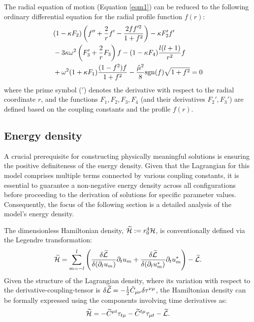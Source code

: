 \documentclass[aps,prd,superscriptaddress,notitlepage,11pt,final,longbibliography,nofootinbib]{revtex4-1}
\newcommand{\be}{\begin{equation}}
\newcommand{\ee}{\end{equation}}
\numberwithin{equation}{section}
\begin{document}
The radial equation of motion (Equation \eqref{eom1}) can be reduced to the following ordinary differential equation for the radial profile function $f(r)$:
\begin{align}
&(1-\kappa F_2)\left(f''+\frac{2}{r}f'-\frac{2ff'^2}{1+f^2}\right)-\kappa F_2'f'\nonumber\\
&-3\kappa\omega^2\left(F_3'+\frac{2}{r}F_3\right)f-(1-\kappa F_4)\frac{l(l+1)}{r^2}f\nonumber\\&+\omega^2(1+\kappa F_1)\frac{(1-f^2)f}{1+f^2}-\frac{\tilde\mu^2}{8}{\rm sgn}(f)\sqrt{1+f^2}=0\label{radialeq}
\end{align}
where the prime symbol ($\prime$) denotes the derivative with respect to the radial coordinate $r$, and the functions $F_1, F_2, F_3, F_4$ (and their derivatives $F_2', F_3'$) are defined based on the coupling constants and the profile $f(r)$.






\subsection{Energy density}
A crucial prerequisite for constructing physically meaningful solutions is ensuring the positive definiteness of the energy density. Given that the Lagrangian for this model comprises multiple terms connected by various coupling constants, it is essential to guarantee a non-negative energy density across all configurations before proceeding to the derivation of solutions for specific parameter values. Consequently, the focus of the following section is a detailed analysis of the model's energy density.

The dimensionless Hamiltonian density, $\widetilde{\cal H} := r_0^4{\cal H}$, is conventionally defined via the Legendre transformation:
\be
\widetilde {\cal H}=\sum_{m=-l}^l\left(\frac{\delta \widetilde{\cal L}}{\delta(\partial_t u_m)}\partial_tu_m+\frac{\delta \widetilde {\cal L}}{\delta(\partial_t u^*_m)}\partial_tu^*_m\right)-\widetilde {\cal L}.
\ee
Given the structure of the Lagrangian density, where its variation with respect to the derivative-coupling-tensor is $\delta \widetilde{\cal L}=-\frac{1}{2}\tilde{C}_{\mu\nu}\delta \tau^{\nu\mu}$, the Hamiltonian density can be formally expressed using the components involving time derivatives as:
\be
\widetilde{\cal H}=-\widetilde C^{\mu t}\tau_{t\mu}-\widetilde C^{t\mu}\tau_{\mu t}-\widetilde{\cal L}.\label{H2}
\ee
\end{document}
